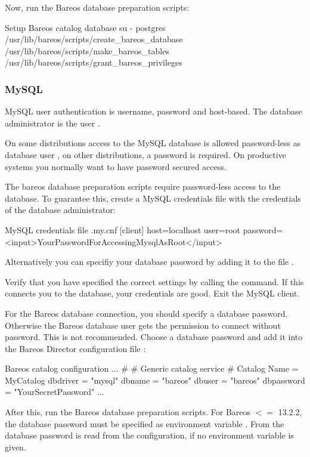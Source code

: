 Now, run the Bareos database preparation scripts: 
\begin{commands}{Setup Bareos catalog database}
su - postgres
/usr/lib/bareos/scripts/create_bareos_database
/usr/lib/bareos/scripts/make_bareos_tables
/usr/lib/bareos/scripts/grant_bareos_privileges
\end{commands}

\subsubsection{MySQL}
    \label{catalog-maintenance-mysql}

MySQL user authentication is username, password and host-based.
The database administrator is the user .

On some distributions access to the MySQL database is allowed password-less as database user ,
on other distributions, a password is required.
On productive systems you normally want to have password secured access.

The bareos database preparation scripts require password-less access to the database.
To guarantee this, create a MySQL credentials file  with the credentials of the database administrator:
\begin{config}{MySQL credentials file .my.cnf}
[client]
host=localhost
user=root
password=<input>YourPasswordForAccessingMysqlAsRoot</input>
\end{config}
Alternatively you can specifiy your database password by adding it to the file .

Verify that you have specified the correct settings by calling the  command.
If this connects you to the database, your credentials are good.
Exit the MySQL client.

For the Bareos database connection, you should specify a database password. 
Otherwise the Bareos database user gets the permission to connect without password.
This is not recommended.
Choose a database password and add it into the Bareos Director configuration file \configFileDirUnix:
\begin{bconfig}{Bareos catalog configuration}
...
#
# Generic catalog service
#
Catalog {
  Name = MyCatalog
  dbdriver = "mysql"
  dbname = "bareos"
  dbuser = "bareos"
  dbpassword = "YourSecretPassword"
}
...
\end{bconfig}

After this, run the Bareos database preparation scripts.
For Bareos $<=$ 13.2.2, the database password must be specified as environment variable .
From 
the database password is read from the configuration, if no environment variable is given.

